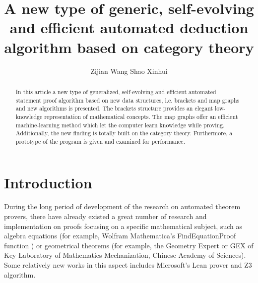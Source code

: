 \documentclass{aims}
\numberwithin{equation}{section}
\numberwithin{theorem}{section}	%
\numberwithin{axiom}{section}	%
\numberwithin{definition}{section}	%
\begin{document}
	\title{A new type of generic, self-evolving and efficient automated deduction algorithm based on category theory}
	\author{%
		Zijian Wang
		Shao Xinhui\affil{*}
	}
	\address{%
	}

	\begin{abstract}
	In this article a new type of generalized, self-evolving and efficient automated statement proof algorithm based on new data structures, i.e. brackets and map graphs
	and new algorithms is presented. The brackets structure provides an elegant low-knowledge representation of mathematical concepts. The map graphs offer an efficient machine-learning method which let the computer learn knowledge while proving. Additionally, the new finding is totally built on the category theory. Furthermore, a prototype of the program is given and examined for performance.
	\end{abstract}


	\maketitle
	
	\section{Introduction}
	During the long period of development of the research on automated theorem provers, there have already existed a great number of research and implementation on proofs focusing on a specific mathematical subject, such as algebra equations (for example, Wolfram Mathematica{'}s FindEquationProof function \cite{Wolfram2019}) or geometrical theorems (for example, the Geometry Expert or GEX \cite{Gao1998} of Key Laboratory of Mathematics Mechanization, Chinese Academy of Sciences). Some relatively new works in this aspect includes Microsoft{'}s Lean prover \cite{Moura2021} and Z3 \cite{Moura2008} algorithm.
	
\end{document}
